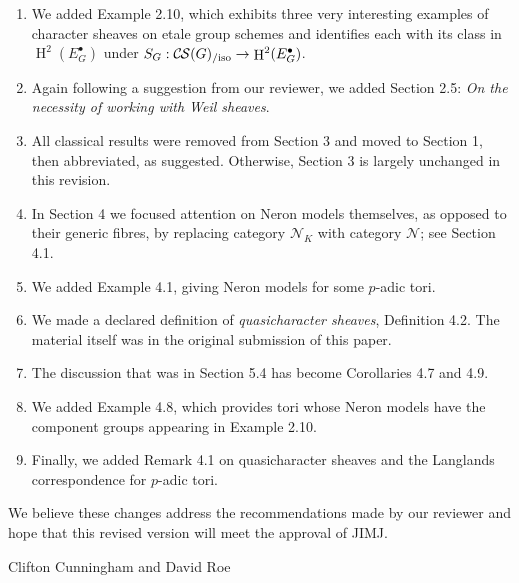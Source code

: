 \documentclass[a4, 10pt]{amsart}
\theoremstyle{definition}
\theoremstyle{remark}
\DeclareMathOperator{\Hh}{H}
\newcommand{\CS}{{\mathcal{C\hskip-0.8pt S}}}
\newcommand{\CSiso}[1]{\CS(#1)_{/\text{iso}}}
\begin{document}
\begin{enumerate}
\item 
We added Example 2.10, which exhibits three very interesting examples of character sheaves on etale group schemes and identifies each with its class in $\Hh^2(E_G^\bullet)$ under $S_G : \CSiso{G} \to \Hh^2(E^\bullet_G)$.
\item
Again following a suggestion from our reviewer, we added Section 2.5: {\it On the necessity of working with Weil sheaves}.
\item
All classical results were removed from Section 3 and moved to Section 1, then abbreviated, as suggested. Otherwise, Section 3 is largely unchanged in this revision.
\item
In Section 4 we focused attention on Neron models themselves, as opposed to their generic fibres, by replacing category $\mathcal{N}_K$ with category $\mathcal{N}$; see Section 4.1.
\item 
We added Example 4.1, giving Neron models for some $p$-adic tori.
\item
We made a declared definition of {\it quasicharacter sheaves}, Definition 4.2. The material itself was in the original submission of this paper.
\item
The discussion that was in Section 5.4 has become Corollaries 4.7 and 4.9.
\item
We added Example 4.8, which provides tori whose Neron models have the component groups appearing in Example 2.10.
\item
Finally, we added Remark 4.1 on quasicharacter sheaves and the Langlands correspondence for $p$-adic tori. 
\end{enumerate}

We believe these changes address the recommendations made by our reviewer and hope that this revised version will meet the approval of JIMJ.

\vskip0.3cm
\vskip0.4cm
\centerline{Clifton Cunningham and David Roe}
\end{document}
